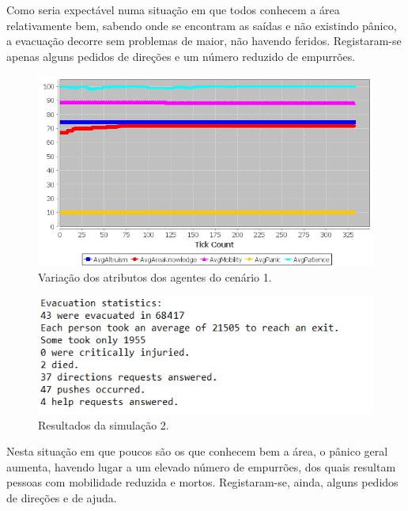 \documentclass[12pt]{article}
\begin{document}
\begin{titlepage}
\begin{itemize}
Como seria expectável numa situação em que todos conhecem a área relativamente bem, sabendo onde se encontram as saídas e não existindo pânico, a evacuação decorre sem problemas de maior, não havendo feridos. Registaram-se apenas alguns pedidos de direções e um número reduzido de empurrões.

\begin{figure}[H]
	\centering
	\includegraphics{graph_sc1.png}
	\caption{Variação dos atributos dos agentes do cenário 1.}
	\label{graph_sc1}
\end{figure}

\begin{figure}[H]
	\centering
	\includegraphics{log_sc2.png}
	\caption{Resultados da simulação 2.}
	\label{log_sc1}
\end{figure}

Nesta situação em que poucos são os que conhecem bem a área, o pânico geral aumenta, havendo lugar a um elevado número de empurrões, dos quais resultam pessoas com mobilidade reduzida e mortos. Registaram-se, ainda, alguns pedidos de direções e de ajuda.


\end{itemize}
\end{titlepage}
\end{document}
